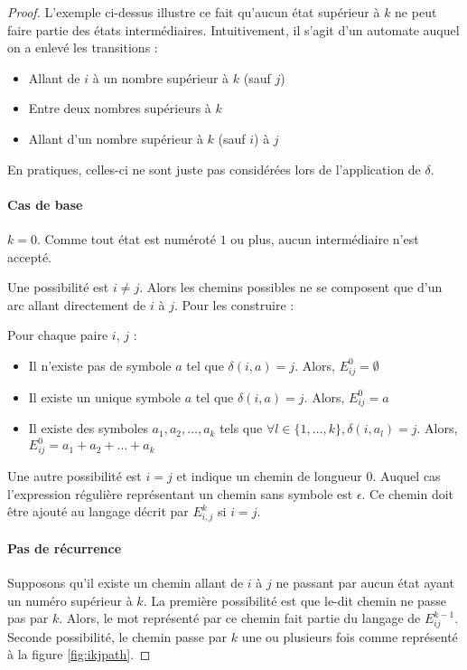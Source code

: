 \begin{proof}
	L'exemple ci-dessus illustre ce fait qu'aucun état supérieur à $k$ ne peut faire partie des états intermédiaires. Intuitivement, il s'agit d'un automate auquel on a enlevé les transitions :
  \begin{itemize}
    \item Allant de $i$ à un nombre supérieur à $k$ (sauf $j$)
    \item Entre deux nombres supérieurs à $k$
    \item Allant d'un nombre supérieur à $k$ (sauf $i$) à $j$
  \end{itemize}
  En pratiques, celles-ci ne sont juste pas considérées lors de l'application de $\delta$.

	\paragraph{Cas de base} $k=0$. Comme tout état est numéroté $1$ ou plus, aucun intermédiaire n'est accepté.

  Une possibilité est $i \neq j$. Alors les chemins possibles ne se composent que d'un arc allant directement de $i$ à $j$. Pour les construire :

	Pour chaque paire $i$, $j$ :
	\begin{itemize}
		\item Il n'existe pas de symbole $a$ tel que $\delta(i,a)=j$. Alors, $E_{ij}^0=\emptyset$
		\item Il existe un unique symbole $a$ tel que  $\delta(i,a)=j$. Alors, $E_{ij}^0=a$
		\item Il existe des symboles $a_1,a_2,\dots,a_k$ tels que $\forall l \in \{1,\dots, k\}, \delta(i,a_l)=j$. Alors, $E_{ij}^0=a_1+a_2+\dots+a_k$
	\end{itemize}


  Une autre possibilité est $i=j$ et indique un chemin de longueur $0$. Auquel cas l'expression régulière représentant un chemin sans symbole est $\epsilon$. Ce chemin doit être ajouté au langage décrit par $E^k_{i,j}$ si $i=j$.


	\paragraph{Pas de récurrence} Supposons qu'il existe un chemin allant de $i$ à $j$ ne passant par aucun état ayant un numéro supérieur à $k$.	La première possibilité est que le-dit chemin ne passe pas par $k$. Alors, le mot représenté par ce chemin fait partie du langage de $E_{ij}^{k-1}$. Seconde possibilité, le chemin passe par $k$ une ou plusieurs fois comme représenté à la figure \ref{fig:ikjpath}.


\end{proof}
